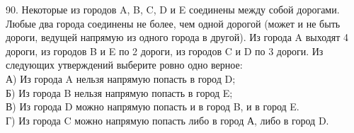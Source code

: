 90. Некоторые из городов A, B, C, D и E соединены между собой дорогами. Любые два города соединены не более, чем одной дорогой (может и не быть дороги, ведущей напрямую из одного города в другой). Из города A выходят 4 дороги, из городов B и E по 2 дороги, из городов C и D по 3 дороги. Из следующих утверждений выберите ровно одно верное:\\
А) Из города A нельзя напрямую попасть в город D;\\
Б) Из города B нельзя напрямую попасть в город E;\\
В) Из города D можно напрямую попасть и в город B, и в город E.\\
Г) Из города C можно напрямую попасть либо в город А, либо в город D.\\

